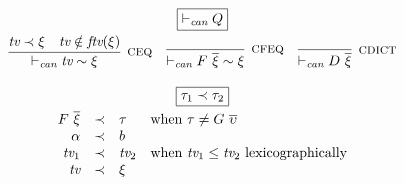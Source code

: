 \documentclass{article}
\newcommand{\multi}[1]{{\overline{#1}}}
\newcommand{\rulen}[1]{\textsc{#1}}
\begin{document}
\[
\begin{array}{c}

\framebox{$\vdash_\textit{can} Q$} \\
\\[-3mm]

\begin{array}{ccc}
\infer[\rulen{ceq}]
  {\vdash_\textit{can} \textit{tv} \sim \xi}
  {\textit{tv} \prec \xi & \textit{tv} \notin \textit{ftv}(\xi)}
&
\infer[\rulen{cfeq}]
  {\vdash_\textit{can} F ~ \multi{\xi} \sim \xi}
  {}
&
\infer[\rulen{cdict}]
  {\vdash_\textit{can} D ~ \multi{\xi}}
  {}
\end{array}\\
\\

\framebox{$\tau_1 \prec \tau_2$} \\
\\[-3mm]

\begin{array}{rcll}
F ~ \multi{\xi} & \prec & \tau          & \text{when} ~ \tau \neq G ~ \multi{\upsilon} \\
\alpha          & \prec & b \\
\textit{tv}_1   & \prec & \textit{tv}_2 & \text{when} ~ \textit{tv}_1 \leq \textit{tv}_2 ~ \text{lexicographically} \\
\textit{tv}     & \prec & \xi \\
\end{array}
\end{array}
\]
\end{document}
